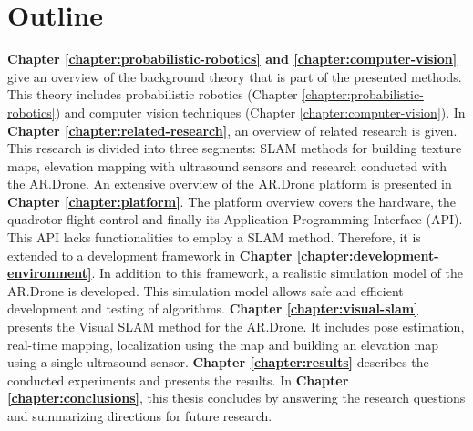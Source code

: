 	\section{Outline}
\textbf{Chapter \ref{chapter:probabilistic-robotics} and \ref{chapter:computer-vision}} give an overview of the background theory that is part of the presented methods.
This theory includes probabilistic robotics (Chapter \ref{chapter:probabilistic-robotics}) and computer vision techniques (Chapter \ref{chapter:computer-vision}).
In \textbf{Chapter \ref{chapter:related-research}}, an overview of related research is given.
This research is divided into three segments: SLAM methods for building texture maps, elevation mapping with ultrasound sensors and research conducted with the AR.Drone.
An extensive overview of the AR.Drone platform is presented in \textbf{Chapter \ref{chapter:platform}}.
The platform overview covers the hardware, the quadrotor flight control and finally its Application Programming Interface (API).
This API lacks functionalities to employ a SLAM method.
Therefore, it is extended to a development framework in \textbf{Chapter \ref{chapter:development-environment}}.
In addition to this framework, a realistic simulation model of the AR.Drone is developed.
This simulation model allows safe and efficient development and testing of algorithms.
\textbf{Chapter \ref{chapter:visual-slam}} presents the Visual SLAM method for the AR.Drone.
It includes pose estimation, real-time mapping, localization using the map and building an elevation map using a single ultrasound sensor.
\textbf{Chapter \ref{chapter:results}} describes the conducted experiments and presents the results.
In \textbf{Chapter \ref{chapter:conclusions}}, this thesis concludes by answering the research questions and summarizing directions for future research.